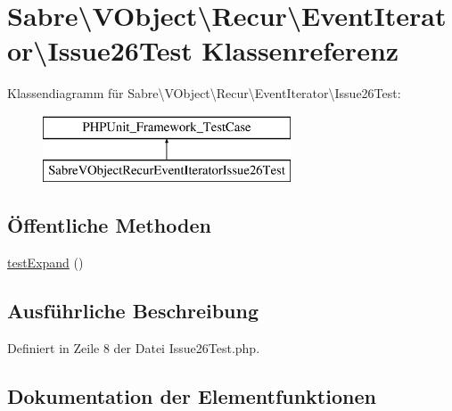 \hypertarget{class_sabre_1_1_v_object_1_1_recur_1_1_event_iterator_1_1_issue26_test}{}\section{Sabre\textbackslash{}V\+Object\textbackslash{}Recur\textbackslash{}Event\+Iterator\textbackslash{}Issue26\+Test Klassenreferenz}
\label{class_sabre_1_1_v_object_1_1_recur_1_1_event_iterator_1_1_issue26_test}
Klassendiagramm für Sabre\textbackslash{}V\+Object\textbackslash{}Recur\textbackslash{}Event\+Iterator\textbackslash{}Issue26\+Test\+:\begin{figure}[H]
\begin{center}
\leavevmode
\includegraphics[height=2.000000cm]{class_sabre_1_1_v_object_1_1_recur_1_1_event_iterator_1_1_issue26_test}
\end{center}
\end{figure}
\subsection*{Öffentliche Methoden}
\begin{DoxyCompactItemize}
\item 
\mbox{\hyperlink{class_sabre_1_1_v_object_1_1_recur_1_1_event_iterator_1_1_issue26_test_ab9e7c9d8e7964ec204751b768f917b1d}{test\+Expand}} ()
\end{DoxyCompactItemize}


\subsection{Ausführliche Beschreibung}


Definiert in Zeile 8 der Datei Issue26\+Test.\+php.



\subsection{Dokumentation der Elementfunktionen}
\mbox{\label{class_sabre_1_1_v_object_1_1_recur_1_1_event_iterator_1_1_issue26_test_ab9e7c9d8e7964ec204751b768f917b1d}} 
